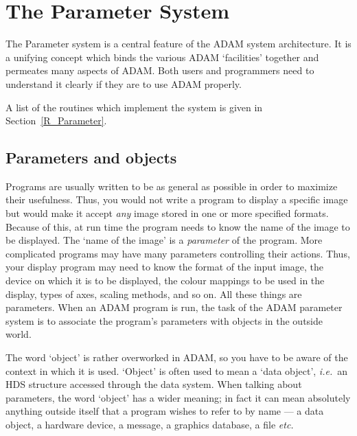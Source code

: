 \chapter{The Parameter System}
\label{C_parsys}

The Parameter system is a central feature of the ADAM system architecture.
It is a unifying concept which binds the various ADAM `facilities' together
and permeates many aspects of ADAM.
Both users and programmers need to understand it clearly if they are to use
ADAM properly.

A list of the routines which implement the system is given in
Section~\ref{R_Parameter}.

\section{Parameters and objects}

Programs are usually written to be as general as possible in order to maximize
their usefulness.
Thus, you would not write a program to display a specific image but would make
it accept {\em any} image stored in one or more specified formats.
Because of this, at run time the program needs to know the name of the image
to be displayed.
The `name of the image' is a {\em parameter} of the program.
More complicated programs may have many parameters controlling their actions.
Thus, your display program may need to know the format of the input image,
the device on which it is to be displayed, the colour mappings to be used in
the display, types of axes, scaling methods, and so on.
All these things are parameters.
When an ADAM program is run, the task of the ADAM parameter system is to
associate the program's parameters with objects in the outside world.

The word `object' is rather overworked in ADAM, so you have to be aware of the
context in which it is used.
`Object' is often used to mean a `data object', {\em i.e.}\, an HDS structure
accessed through the data system.
When talking about parameters, the word `object' has a wider meaning;
in fact it can mean absolutely anything outside itself that a program wishes
to refer to by name --- a data object, a hardware device, a message, a graphics
database, a file {\em etc.}

